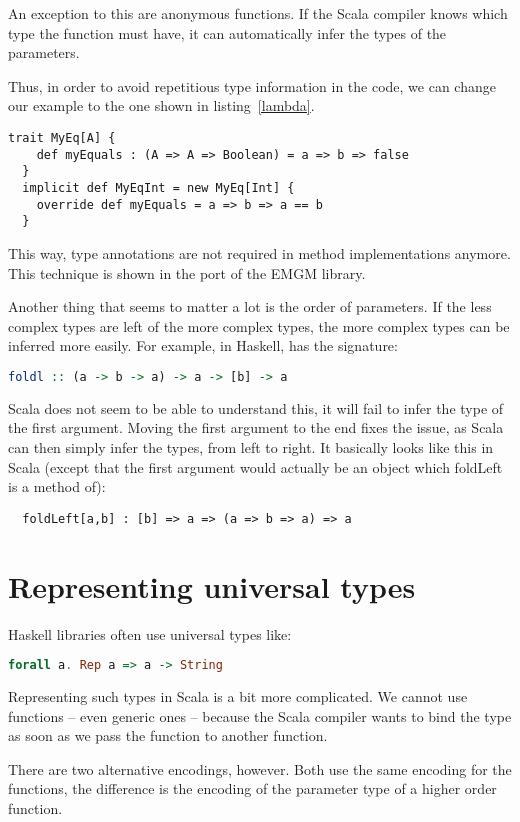 An exception to this are anonymous functions.
If the Scala compiler knows which type the
function must have, it can automatically infer the types of the parameters.

Thus, in order to avoid repetitious type information in the code,
we can change our  example to the one shown in listing~\ref{lambda}.
\begin{lstlisting}[caption=Improving type inference using lambdas,label=lambda]
  trait MyEq[A] {
    def myEquals : (A => A => Boolean) = a => b => false
  }
  implicit def MyEqInt = new MyEq[Int] {
    override def myEquals = a => b => a == b
  }
\end{lstlisting}
This way,
type annotations are not required in method implementations anymore. This
technique is shown in the port of the EMGM library.

Another thing that seems to matter a lot is the order of parameters. If
the less complex types are left of the more complex types, the more
complex types can be inferred more easily. For example, in Haskell,
 has the signature:
\begin{lstlisting}[language=Haskell]
  foldl :: (a -> b -> a) -> a -> [b] -> a
\end{lstlisting}
Scala does not seem to be able to understand this, it will fail to
infer the type of the first argument. Moving the first argument to
the end fixes the issue, as Scala can then simply infer the types, from left
to right. It basically looks like this in Scala (except that
the first argument would actually be an object which foldLeft is a method
of):
\begin{lstlisting}
  foldLeft[a,b] : [b] => a => (a => b => a) => a
\end{lstlisting}

\section{Representing universal types}
\label{universal-types}
Haskell libraries often use universal types like:
\begin{lstlisting}[language=Haskell]
  forall a. Rep a => a -> String
\end{lstlisting}
Representing such types in Scala is a bit more complicated. We cannot use
functions -- even generic ones -- because the Scala
compiler wants to bind the  type as soon as we pass the function to
another function.

There are two alternative encodings, however. Both use the same encoding for
the functions, the difference is the encoding of the parameter type of a higher
order function.

